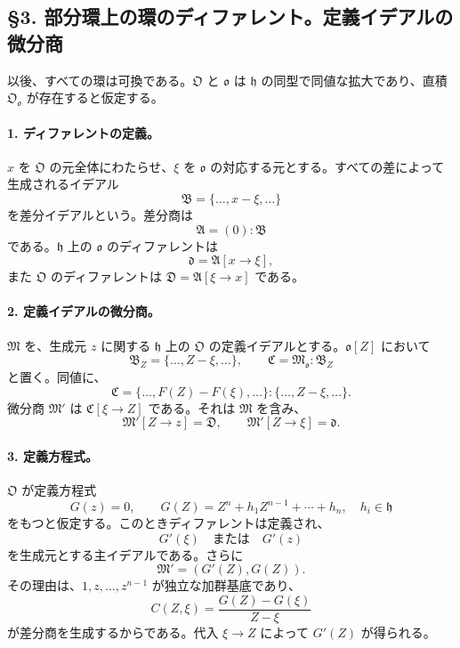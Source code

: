 \documentclass[11pt]{article}
\begin{document}
\subsection*{§3. 部分環上の環のディファレント。定義イデアルの微分商}

以後、すべての環は可換である。\(\mathfrak O\) と \(\mathfrak o\) は \(\mathfrak h\) の同型で同値な拡大であり、直積 \(\mathfrak O_{\mathfrak o}\) が存在すると仮定する。

\paragraph{1. ディファレントの定義。}
\(x\) を \(\mathfrak O\) の元全体にわたらせ、\(\xi\) を \(\mathfrak o\) の対応する元とする。すべての差によって生成されるイデアル
\[
        \mathfrak B=\{\ldots,x-\xi,\ldots\}
\]
を差分イデアルという。差分商は
\[
        \mathfrak A=(0):\mathfrak B
\]
である。\(\mathfrak h\) 上の \(\mathfrak o\) のディファレントは
\[
        \mathfrak d=\mathfrak A[x\to\xi],
\]
また \(\mathfrak O\) のディファレントは \(\mathfrak D=\mathfrak A[\xi\to x]\) である。

\paragraph{2. 定義イデアルの微分商。}
\(\mathfrak M\) を、生成元 \(z\) に関する \(\mathfrak h\) 上の \(\mathfrak O\) の定義イデアルとする。\(\mathfrak o[Z]\) において
\[
        \mathfrak B_Z=\{\ldots,Z-\xi,\ldots\},
        \qquad
        \mathfrak C=\mathfrak M_{\mathfrak o}:\mathfrak B_Z
\]
と置く。同値に、
\[
        \mathfrak C=\{\ldots,F(Z)-F(\xi),\ldots\}:\{\ldots,Z-\xi,\ldots\}.
\]
微分商 \(\mathfrak M'\) は \(\mathfrak C[\xi\to Z]\) である。それは \(\mathfrak M\) を含み、
\[
        \mathfrak M'[Z\to z]=\mathfrak D,
        \qquad
        \mathfrak M'[Z\to\xi]=\mathfrak d.
\]

\paragraph{3. 定義方程式。}
\(\mathfrak O\) が定義方程式
\[
        G(z)=0,
        \qquad
        G(Z)=Z^n+h_1Z^{n-1}+\cdots+h_n,
        \quad h_i\in\mathfrak h
\]
をもつと仮定する。このときディファレントは定義され、
\[
        G'(\xi) \quad\text{または}\quad G'(z)
\]
を生成元とする主イデアルである。さらに
\[
        \mathfrak M'=(G'(Z),G(Z)).
\]
その理由は、\(1,z,\ldots,z^{n-1}\) が独立な加群基底であり、
\[
        C(Z,\xi)=\frac{G(Z)-G(\xi)}{Z-\xi}
\]
が差分商を生成するからである。代入 \(\xi\to Z\) によって \(G'(Z)\) が得られる。
\end{document}
